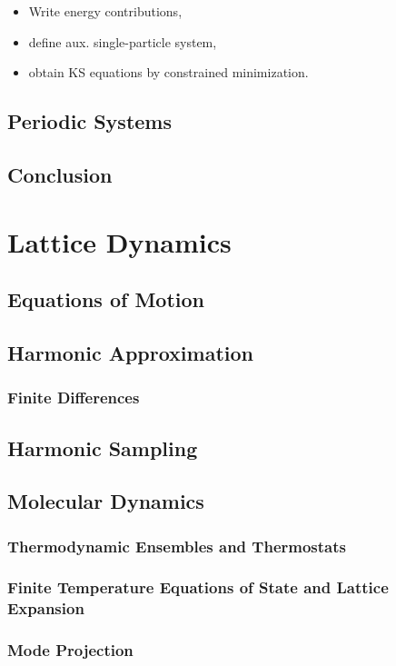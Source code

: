\documentclass[a4paper,12pt]{book}
\begin{document}
\begin{itemize}
	\item Write energy contributions,
	\item define aux. single-particle system,
	\item obtain KS equations by constrained minimization.
\end{itemize}

\subsection{Periodic Systems}

\subsection{Conclusion}

\section{Lattice Dynamics}
\subsection{Equations of Motion}
\subsection{Harmonic Approximation}
\subsubsection{Finite Differences}
\subsection{Harmonic Sampling}

\subsection{Molecular Dynamics}
\subsubsection{Thermodynamic Ensembles and Thermostats}
\subsubsection{Finite Temperature Equations of State and Lattice Expansion}
\subsubsection{Mode Projection}
\end{document}
